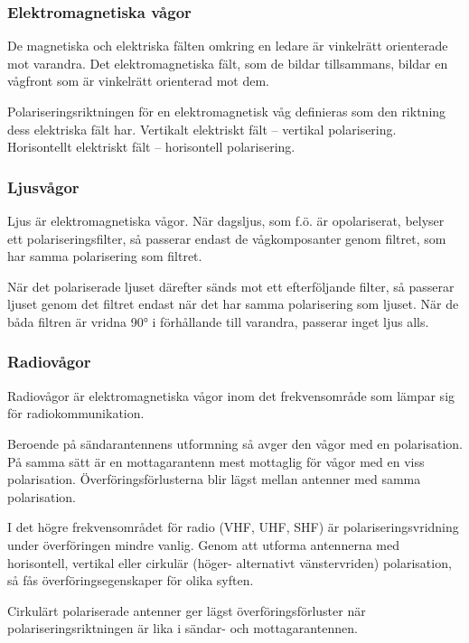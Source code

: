 \subsubsection{Elektromagnetiska vågor}

De magnetiska och elektriska fälten omkring en ledare är vinkelrätt orienterade
mot varandra. Det elektromagnetiska fält, som de bildar tillsammans, bildar en
vågfront som är vinkelrätt orienterad mot dem.

Polariseringsriktningen för en elektromagnetisk våg definieras som den riktning
dess elektriska fält har.
Vertikalt elektriskt fält -- vertikal polarisering.
Horisontellt elektriskt fält -- horisontell polarisering.

\subsubsection{Ljusvågor}

Ljus är elektromagnetiska vågor. När dagsljus, som f.ö. är opolariserat,
belyser ett polariseringsfilter, så passerar endast de vågkomposanter genom
filtret, som har samma polarisering som filtret.

När det polariserade ljuset därefter sänds mot ett efterföljande filter, så
passerar ljuset genom det filtret endast när det har samma polarisering som
ljuset. När de båda filtren är vridna 90° i förhållande till varandra,
passerar inget ljus alls.

\subsubsection{Radiovågor}
Radiovågor är elektromagnetiska vågor inom det frekvensområde som lämpar sig
för radiokommunikation.

Beroende på sändarantennens utformning så avger den vågor med en polarisation.
På samma sätt är en mottagarantenn mest mottaglig för vågor med en viss
polarisation. Överföringsförlusterna blir lägst mellan antenner med samma
polarisation.

I det högre frekvensområdet för radio (VHF, UHF, SHF) är polariseringsvridning
under överföringen mindre vanlig. Genom att utforma antennerna med horisontell,
vertikal eller cirkulär (höger- alternativt vänstervriden) polarisation, så fås
överföringsegenskaper för olika syften.

Cirkulärt polariserade antenner ger lägst överföringsförluster när
polariseringsriktningen är lika i sändar- och mottagarantennen.


